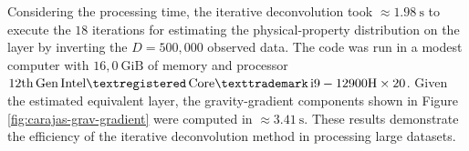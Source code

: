 Considering the processing time, the iterative deconvolution took  $\approx 1.98 \: \mathrm{s}$ to execute the $18$
iterations for estimating the physical-property distribution on the layer by inverting the $D = 500,000$ observed data.
The code was run in a modest computer with $16,0 \: \mathrm{GiB}$ of memory and processor 
$\mathrm{12th \, Gen \, Intel\textregistered \, Core\texttrademark \, i9-12900H \times 20}$.
Given the estimated equivalent layer, the gravity-gradient components shown in Figure \ref{fig:carajas-grav-gradient} were computed in
$\approx 3.41 \: \mathrm{s}$.
These results demonstrate the efficiency of the iterative deconvolution method in processing large datasets.





%
%
%
%
%
%
%
%
%
%
%
%
%
%
%

